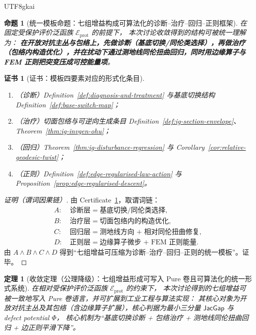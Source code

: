\documentclass[12pt]{article}
\newtheorem{theorem}{定理}[section]
\newtheorem{proposition}{命题}[section]
\newtheorem{certificate}{证书}[section]
\newcommand{\JacGap}{\ensuremath{\mathsf{JacGap}}}
\begin{document}
\begin{CJK*}{UTF8}{gkai}
\begin{proposition}[统一模板命题：七组增益构成可算法化的诊断--治疗--回归--正则框架]
\label{prop:discussion-gains-template}
在固定受保护评价泛函族 $\mathcal{E}_{\mathrm{prot}}$ 的前提下，
本次讨论收敛得到的结构可被统一理解为：
\textbf{在开放对抗主丛与包络上，先做诊断（基底切换/同伦类选择），再做治疗（包络内构造优化），并在扰动下通过测地线同伦扭曲回归，同时用边缘算子与 FEM 正则把突变压成可控能量项}。
\end{proposition}

\begin{certificate}[证书：模板四要素对应的形式化条目]
\label{cert:discussion-gains-template}
\begin{enumerate}
  \item（诊断）Definition~\ref{def:diagnosis-and-treatment} 与基底切换结构 Definition~\ref{def:base-switch-map}；
  \item（治疗）切面包络与可逆向生成条目 Definition~\ref{def:ig-section-envelope}、Theorem~\ref{thm:ig-invgen-ohu}；
  \item（回归）Theorem~\ref{thm:ig-disturbance-regression} 与 Corollary~\ref{cor:relative-geodesic-twist}；
  \item（正则）Definition~\ref{def:edge-regularised-law-action} 与 Proposition~\ref{prop:edge-regularised-descent}。
\end{enumerate}
\end{certificate}

\begin{proof}[证明（谓词因果链）]
由 Certificate~\ref{cert:discussion-gains-template}，取谓词链：
\[
\begin{aligned}
A:&\ \text{诊断层}= \text{基底切换/同伦类选择},\\
B:&\ \text{治疗层}= \text{切面包络内的构造优化},\\
C:&\ \text{回归层}= \text{测地线方向 + 相对同伦扭曲修复},\\
D:&\ \text{正则层}= \text{边缘算子微步 + FEM 正则能量}.
\end{aligned}
\]
由 $A\wedge B\wedge C\wedge D$ 得到“七组增益可压缩为诊断--治疗--回归--正则的统一模板”。证毕。
\end{proof}

\begin{theorem}[收敛定理（公理降级）：七组增益形成可写入 Pure 卷且可算法化的统一形式系统]
\label{thm:discussion-convergence}
在相对受保护评价泛函族 $\mathcal{E}_{\mathrm{prot}}$ 的约束下，
本次讨论得到的七组增益可被一致地写入 Pure 卷语言，并可扩展到工业工程与算法实现：
其核心对象为开放对抗主丛及其包络（含边缘算子扩展），核心判据为最小三分量 $\JacGap$ 与 defect potential $\Phi$，
核心机制为“基底切换诊断 + 包络治疗 + 测地线同伦扭曲回归 + 边正则平滑下降”。
\end{theorem}


\end{CJK*}
\end{document}
